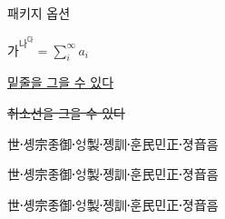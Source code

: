 \documentclass{article}
\begin{document}
패키지 옵션

$가^{나^다}=\sum_i^\infty a_i$




\uline{밑줄을 그을 수 있다}

\sout{취소선을 그을 수 있다}






\hellipsis

\begin{vertical}{20em}
\verticalhangulfont
世솅〮宗조ᇰ御ᅌᅥᆼ〮製졩〮訓훈〮民민正져ᇰ〮音ᅙᅳᆷ
\end{vertical}

\begin{verticaltypesetting}
\verticalhangulfont
世솅〮宗조ᇰ御ᅌᅥᆼ〮製졩〮訓훈〮民민正져ᇰ〮音ᅙᅳᆷ
\begin{horizontal}{20em}
\normalfont
世솅〮宗조ᇰ御ᅌᅥᆼ〮製졩〮訓훈〮民민正져ᇰ〮音ᅙᅳᆷ
\end{horizontal}
\end{verticaltypesetting}
\end{document}
